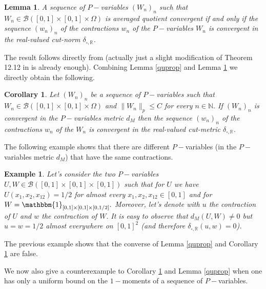 \documentclass[11pt]{article}
\newtheorem{corollary}{Corollary}[theorem]
\newtheorem{lemma}[theorem]{Lemma}
\newtheorem{example}[theorem]{Example}
\def\R{\mathbb{R}}
\def\N{\mathbb{N}}
\newcommand{\cB}{{\mathcal B}}  %
\begin{document}
\begin{lemma}\label{ThmAvQuotCutMet}
A sequence of $P-$variables $(W_n)_n$ such that $W_n\in \cB([0,1]\times [0,1]\times \Omega)$ is averaged quotient convergent if and only if the sequence $(w_n)_n$ of the contractions $w_n$ of the $P-$variables $W_n$ is convergent in the real-valued cut-norm $\delta_{\square,\R}$.
\end{lemma}
\proof
The result follows directly from \cite{Lpgraphon2} (actually just a slight modification of Theorem 12.12 in \cite{LovaszGraphLimits} is already enough).
\endproof
Combining Lemma \ref{quprop} and Lemma \ref{ThmAvQuotCutMet} we directly obtain the following.
\begin{corollary}\label{CorollAverQuot}
Let $(W_n)_n$ be a sequence of $P-$variables such that $W_n\in \cB([0,1]\times [0,1]\times \Omega)$ and $\|W_n\|_{p}\leq C$ for every $n\in \N.$ If $(W_n)_n$ is convergent in the $P-$variables metric $d_M$ then the sequence $(w_n)_n$ of the contractions $w_n$ of the  $W_n$ is convergent in the real-valued cut-metric $\delta_{\square,\R}.$
\end{corollary}
The following example shows that there are different $P-$variables (in the $P-$variables metric $d_M$) that have the same contractions. 
\begin{example}
Let's consider the two $P-$variables $U,W\in \cB([0,1]\times [0,1]\times [0,1])$ such that for $U$ we have $U(x_1,x_2,x_{12})=1/2$ for almost every $x_1,x_2,x_{12}\in [0,1]$ and for $W=\mathbbm{1}_{[0,1]\times[0,1]\times[0,1/2]}.$ Moreover, let's denote with $u$ the contraction of $U$ and $w$ the contraction of $W.$ It is easy to observe that $d_M(U,W)\neq 0$ but $u=w=1/2$ almost everywhere on $[0,1]^2$ (and therefore $\delta_{\square,\R}(u,w)=0$).
\end{example}

The previous example shows that the converse of Lemma \ref{quprop} and Corollary \ref{CorollAverQuot} are false.

We now also give a counterexample to Corollary \ref{CorollAverQuot} and Lemma \ref{quprop} when one has only a uniform bound on the $1-$moments of a sequence of $P-$variables.
\end{document}
